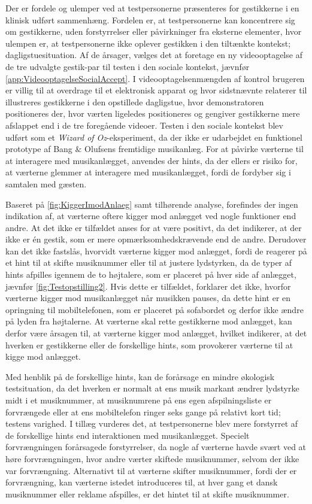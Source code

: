Der er fordele og ulemper ved at testpersonerne præsenteres for gestikkerne i en klinisk udført sammenhæng. Fordelen er, at testpersonerne kan koncentrere sig om gestikkerne, uden forstyrrelser eller påvirkninger fra eksterne elementer, hvor ulempen er, at testpersonerne ikke oplever gestikken i den tiltænkte kontekst; dagligstuesituation. Af de årsager, vælges det at foretage en ny videooptagelse af de tre udvalgte gestik-par til testen i den sociale kontekst, jævnfør \autoref{app:VideooptagelseSocialAccept}. I videooptagelsenmængden af kontrol brugeren er villig til at overdrage til et elektronisk apparat og hvor sidstnævnte relaterer til illustreres gestikkerne i den opstillede dagligstue, hvor demonstratoren positioneres der, hvor værten ligeledes positioneres og gengiver gestikkerne mere afslappet end i de tre foregående videoer.\blankline 
%
Testen i den sociale kontekst blev udført som et \textit{Wizard of Oz}-eksperiment, da der ikke er udarbejdet en funktionel prototype af Bang $\&$ Olufsens fremtidige musikanlæg. For at påvirke værterne til at interagere med musikanlægget, anvendes der hints, da der ellers er risiko for, at værterne glemmer at interagere med musikanlægget, fordi de fordyber sig i samtalen med gæsten. 

Baseret på \autoref{fig:KiggerImodAnlaeg} samt tilhørende analyse, forefindes der ingen indikation af, at værterne oftere kigger mod anlægget ved nogle funktioner end andre. At det ikke er tilfældet anses for at være positivt, da det indikerer, at der ikke er én gestik, som er mere opmærksomhedskrævende end de andre. Derudover kan det ikke fastslås, hvorvidt værterne kigger mod anlægget, fordi de reagerer på et hint til at skifte musiknummer eller til at justere lydstyrken, da de typer af hints afpilles igennem de to højtalere, som er placeret på hver side af anlægget, jævnfør \autoref{fig:Testopstilling2}. Hvis dette er tilfældet, forklarer det ikke, hvorfor værterne kigger mod musikanlægget når musikken pauses, da dette hint er en opringning til mobiltelefonen, som er placeret på sofabordet og derfor ikke ændre på lyden fra højtalerne. At værterne skal rette gestikkerne mod anlægget, kan derfor være årsagen til, at værterne kigger mod anlægget, hvilket indikerer, at det hverken er gestikkerne eller de forskellige hints, som provokerer værterne til at kigge mod anlægget.     

Med henblik på de forskellige hints, kan de forårsage en mindre økologisk testsituation, da det hverken er normalt at ens musik markant ændrer lydstyrke midt i et musiknummer, at musiknumrene på ens egen afspilningsliste er forvrængede eller at ens mobiltelefon ringer seks gange på relativt kort tid; testens varighed. I tillæg vurderes det, at testpersonerne blev mere forstyrret af de forskellige hints end interaktionen med musikanlægget. Specielt forvrængningen forårsagede forstyrrelser, da nogle af værterne havde svært ved at høre forvrængningen, hvor andre værter skiftede musiknummer, selvom der ikke var forvrængning. Alternativt til at værterne skifter musiknummer, fordi der er forvrængning, kan værterne istedet introduceres til, at hver gang et dansk musiknummer eller reklame afspilles, er det hintet til at skifte musiknummer.

